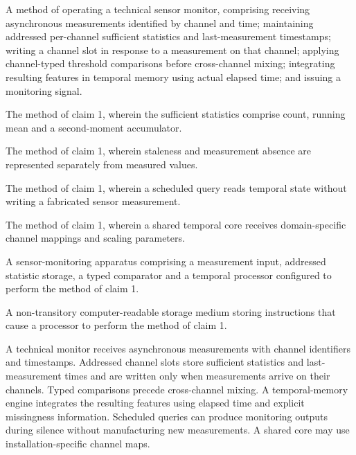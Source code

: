 \documentclass[pct]{sm-patent}
\begin{document}
\begin{patentclaims}

\item A method of operating a technical sensor monitor, comprising receiving asynchronous measurements identified by channel and time; maintaining addressed per-channel sufficient statistics and last-measurement timestamps; writing a channel slot in response to a measurement on that channel; applying channel-typed threshold comparisons before cross-channel mixing; integrating resulting features in temporal memory using actual elapsed time; and issuing a monitoring signal.

\item The method of claim 1, wherein the sufficient statistics comprise count, running mean and a second-moment accumulator.

\item The method of claim 1, wherein staleness and measurement absence are represented separately from measured values.

\item The method of claim 1, wherein a scheduled query reads temporal state without writing a fabricated sensor measurement.

\item The method of claim 1, wherein a shared temporal core receives domain-specific channel mappings and scaling parameters.

\item A sensor-monitoring apparatus comprising a measurement input, addressed statistic storage, a typed comparator and a temporal processor configured to perform the method of claim 1.

\item A non-transitory computer-readable storage medium storing instructions that cause a processor to perform the method of claim 1.

\end{patentclaims}

\abstractstart

A technical monitor receives asynchronous measurements with channel identifiers and timestamps. Addressed channel slots store sufficient statistics and last-measurement times and are written only when measurements arrive on their channels. Typed comparisons precede cross-channel mixing. A temporal-memory engine integrates the resulting features using elapsed time and explicit missingness information. Scheduled queries can produce monitoring outputs during silence without manufacturing new measurements. A shared core may use installation-specific channel maps.
\end{document}

